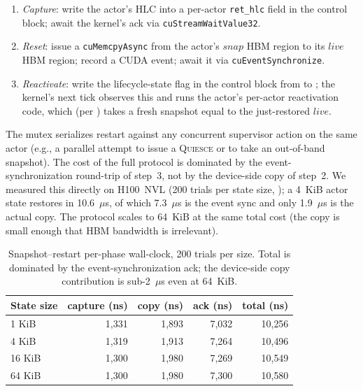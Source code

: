 \begin{enumerate}
\item \emph{Capture}: write the actor's HLC into a per-actor
\texttt{ret\_hlc} field in the control block; await the kernel's
ack via \texttt{cuStreamWaitValue32}.

\item \emph{Reset}: issue a \texttt{cuMemcpyAsync} from the actor's
\(\mathit{snap}\) HBM region to its \(\mathit{live}\) HBM region;
record a CUDA event; await it via
\texttt{cuEventSynchronize}.

\item \emph{Reactivate}: write the lifecycle-state flag in the
control block from \Failed{} to \Initializing{}; the kernel's next
tick observes this and runs the actor's per-actor reactivation
code, which (per ) takes a fresh snapshot equal
to the just-restored \(\mathit{live}\).
\end{enumerate}

The mutex serializes restart against any concurrent supervisor
action on the same actor (e.g., a parallel attempt to issue a
\textsc{Quiesce} or to take an out-of-band snapshot). The cost of
the full protocol is dominated by the event-synchronization
round-trip of step~3, not by the device-side copy of step~2.  We
measured this directly on H100~NVL (200 trials per state size,
); a 4~KiB actor state restores in
10.6~$\mu$s, of which 7.3~$\mu$s is the event sync and only
1.9~$\mu$s is the actual copy.  The protocol scales to 64~KiB at
the same total cost (the copy is small enough that HBM bandwidth
is irrelevant).

\begin{table}[htbp]
\centering
\begin{tabular}{lrrrr}
\toprule
State size & capture (ns) & copy (ns) & ack (ns) & total (ns) \\
\midrule
1 KiB  & 1{,}331 & 1{,}893 & 7{,}032 & 10{,}256 \\
4 KiB  & 1{,}319 & 1{,}913 & 7{,}264 & 10{,}496 \\
16 KiB & 1{,}300 & 1{,}980 & 7{,}269 & 10{,}549 \\
64 KiB & 1{,}300 & 1{,}980 & 7{,}300 & 10{,}580 \\
\bottomrule
\end{tabular}
\caption{Snapshot--restart per-phase wall-clock, 200 trials per
size.  Total is dominated by the event-synchronization ack; the
device-side copy contribution is sub-2~$\mu$s even at 64~KiB.}
\label{tab:snapshot}
\end{table}

